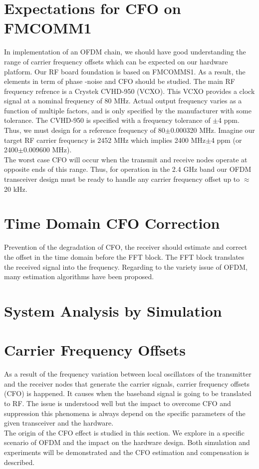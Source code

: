 \section{Expectations for CFO on FMCOMM1}

In implementation of an OFDM chain, we should have good understanding the range of carrier frequency offsets which can be expected on our hardware platform. Our RF board foundation is based on FMCOMMS1. As a result, the elements in term of phase -noise and CFO should be studied. The main RF frequency refrence is a Crystek CVHD-950 (VCXO). This VCXO provides a clock signal at a nominal frequency of 80 MHz. Actual output frequency varies as a function of multiple factors, and is only specified by the manufacturer with some tolerance. The CVHD-950 is specified with a frequency tolerance of $\pm$4 ppm. Thus, we must design for a reference frequency of 80$\pm$0.000320 MHz. Imagine our target RF carrier frequency is 2452 MHz which implies 2400 MHz$\pm$4 ppm (or 2400$\pm$0.009600 MHz).\\
The worst case CFO will occur when the transmit and receive nodes operate at opposite ends of this range. Thus, for operation in the 2.4 GHz band our OFDM transceiver design must be ready to handle any carrier frequency offset up to $\approx$20 kHz.


\section{Time Domain CFO Correction}
Prevention of the degradation of CFO, the receiver should estimate and correct the offset in the time domain before the FFT block. The FFT block translates the received signal into the frequency. Regarding to the variety issue of OFDM, many estimation algorithms have been proposed.\\

\section{System Analysis by Simulation}
\label{sec_anasim}

\section{Carrier Frequency Offsets}
\label{sec_simstruct}
As a result of the frequency variation between local oscillators of the transmitter and the receiver nodes that generate the carrier signals, carrier frequency offsets (CFO) is happened. It causes when the baseband signal is going to be translated to RF. The issue is understood well but the impact to overcome CFO and suppression this phenomena is always depend on the specific parameters of the given transceiver and the hardware.\\
The origin of the CFO effect is studied in this section. We explore in a specific scenario of OFDM and the impact on the hardware design. Both simulation and experiments will be demonstrated and the CFO estimation and compensation is described.\\

